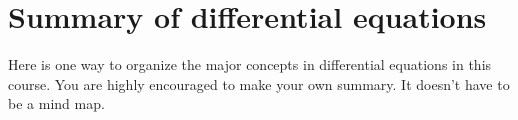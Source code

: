 \documentclass[../main.tex]{subfiles}
\begin{document}
 \section{Summary of differential equations}

Here is one way to organize the major concepts in differential equations in this course. You are highly encouraged to make your own summary. It doesn't have to be a mind map.

\begin{center}
\end{center}
\end{document}
